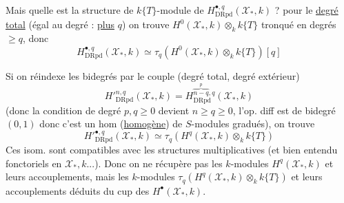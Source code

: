 Mais quelle est  la structure de $k\{T\}$-module de $H^{\bullet,q}_{\mathrm{DRpd}}(\mathcal X_*,k)$ ?  pour le \uline{degré total} (égal au degré  : \uline{plus} $q$) on trouve $H^0(\mathcal X_*,k)\otimes_k k\{T\}$ tronqué en degrés $\geq q$, donc
\[
H^{\bullet,q}_{\mathrm{DRpd}}(\mathcal X_*,k)\simeq\tau_q\left(H^0(\mathcal X_*,k)\otimes_k k\{T\}\right)[q]
\]

Si on réindexe les bidegrés par le couple (degré total, degré extérieur)
\[
H'^{n,q}_{\mathrm{DRpd}}(\mathcal X_*,k)=H^{\overbrace{n-q}^{p},q}_{\mathrm{DRpd}}(\mathcal X_*,k)
\]
(donc la condition de degré $p,q\geq0$ devient $n\geq q\geq0$, l'op. diff est de bidegré $(0,1)$ donc c'est un hom (\uline{homogène}) de $S$-modules gradués), on trouve
\[
H'^{\bullet,q}_{\mathrm{DRpd}}(\mathcal X_*,k)\simeq\tau_q\left(H^q(\mathcal X_*,k)\otimes_k k\{T\}\right)
\]
Ces isom. sont compatibles avec les structures multiplicatives (et bien entendu fonctoriels en $\mathcal X_*,k$...). Donc  on ne récupère pas  les $k$-modules $H^q(\mathcal X_*,k)$ et leurs accouplements, mais les $k$-modules  $\tau_q(H^q(\mathcal X_*,k)\otimes_k k\{T\})$ et leurs accouplements déduits du cup des $H^\bullet(\mathcal X_*,k)$.
